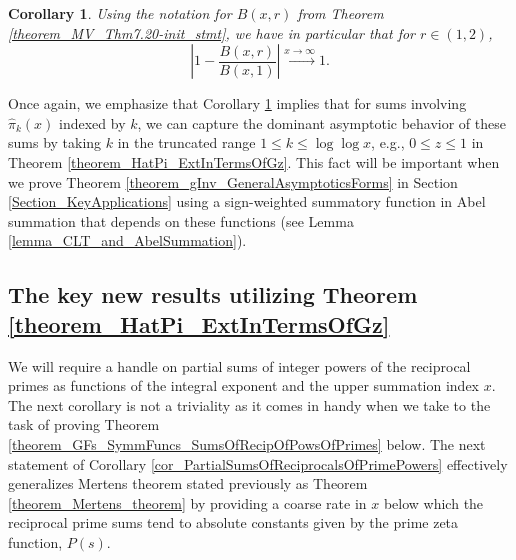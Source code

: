 \documentclass[11pt,reqno,a4letter]{article}
\numberwithin{figure}{section}
\numberwithin{table}{section}
\theoremstyle{plain}
\newtheorem{cor}[theorem]{Corollary}
\numberwithin{theorem}{section}
\theoremstyle{definition}
\begin{document}
\begin{cor} 
\label{theorem_MV_Thm7.20} 
Using the notation for $B(x, r)$ from Theorem \ref{theorem_MV_Thm7.20-init_stmt}, 
we have in particular that for $r \in \left(1, 2\right)$, 
\[
\left\lvert 1 - \frac{B(x, r)}{B\left(x, 1\right)} \right\rvert \xrightarrow{x \rightarrow \infty} 1. 
\]
\end{cor} 

Once again, we emphasize that 
Corollary \ref{theorem_MV_Thm7.20} implies that for sums involving $\widehat{\pi}_k(x)$ indexed by $k$, 
we can capture the dominant asymptotic behavior of these sums by taking $k$ in the truncated range 
$1 \leq k \leq \log\log x$, e.g., $0 \leq z \leq 1$ in Theorem \ref{theorem_HatPi_ExtInTermsOfGz}. 
This fact will be important when we prove 
Theorem \ref{theorem_gInv_GeneralAsymptoticsForms} in 
Section \ref{Section_KeyApplications} using a sign-weighted 
summatory function in Abel summation that depends on these functions 
(see Lemma \ref{lemma_CLT_and_AbelSummation}). 


\subsection{The key new results utilizing Theorem \ref{theorem_HatPi_ExtInTermsOfGz}} 

We will require a handle on partial sums of integer powers of the reciprocal primes as 
functions of the integral exponent and the upper summation index $x$. 
The next corollary is not a triviality as it comes in handy when we take to the task of 
proving Theorem \ref{theorem_GFs_SymmFuncs_SumsOfRecipOfPowsOfPrimes} below. 
The next statement of Corollary \ref{cor_PartialSumsOfReciprocalsOfPrimePowers} 
effectively generalizes Mertens theorem stated previously as Theorem \ref{theorem_Mertens_theorem} 
by providing a coarse rate in $x$ below which the reciprocal prime sums tend to 
absolute constants given by the prime zeta function, $P(s)$. 
\end{document}
